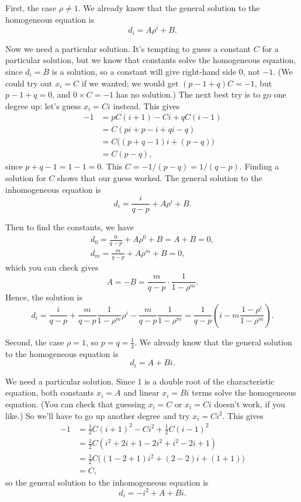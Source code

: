 \documentclass[
  a4paper,
]{article}
\theoremstyle{definition}
\theoremstyle{definition}
\theoremstyle{definition}
\theoremstyle{remark}
\begin{document}
First, the case \(\rho \neq 1\). We already know that the general solution to the homogeneous equation is
\[ d_i =  A \rho^i + B . \]

Now we need a particular solution. It's tempting to guess a constant \(C\) for a particular solution, but we know that constants solve the homogeneous equation, since \(d_i = B\) is a solution, so a constant will give right-hand side \(0\), not \(-1\). (We could try out \(x_i = C\) if we wanted; we would get \((p - 1 + q)C = -1\), but \(p-1+q=0\), and \(0 \times C = -1\) has no solution.) The next best try is to go one degree up: let's guess \(x_i = Ci\) instead. This gives
\begin{align*}
  -1 &= pC(i+1) - Ci + qC(i-1)\\
     &= C(pi + p - i + qi - q) \\
     &= C\big((p+q-1)i + (p-q)\big) \\
     &= C(p-q) ,
  \end{align*}
since \(p + q - 1 = 1 - 1 = 0\). This \(C = -1/(p-q) = 1/(q-p)\). Finding a solution for \(C\) shows that our guess worked. The general solution to the inhomogeneous equation is
\[ d_i = \frac{i}{q-p} + A \rho^i + B .  \]

Then to find the constants, we have
\begin{gather*} d_0 = \frac{0}{q-p} + A \rho^0 + B = A+B = 0, \\
                  d_m = \frac{m}{q-p} + A \rho^m + B = 0 , \end{gather*}
which you can check gives
\[ A = -B = \frac{m}{q-p} \cdot \frac{1}{1 - \rho^m} . \]
Hence, the solution is
\[ d_i = \frac{i}{q-p} + \frac{m}{q-p} \frac{1}{1 - \rho^m} \rho^i - \frac{m}{q-p} \frac{1}{1 - \rho^m} =  \frac{1}{q-p} \left(i - m\frac{1-\rho^i}{1- \rho^m} \right) . \]

Second, the case \(\rho = 1\), so \(p = q = \frac12\). We already know that the general solution to the homogeneous equation is
\[ d_i =  A + Bi . \]

We need a particular solution. Since 1 is a double root of the characteristic equation, both constants \(x_i = A\) and linear \(x_i = Bi\) terms solve the homogeneous equation. (You can check that guessing \(x_i = C\) or \(x_i = Ci\) doesn't work, if you like.) So we'll have to go up another degree and try \(x_i = Ci^2\). This gives
\begin{align*}
    -1 &= \tfrac12 C(i+1)^2 - Ci^2 + \tfrac 12 C(i-1)^2 \\
       &= \tfrac12 C(i^2 + 2i + 1 - 2i^2 + i^2 - 2i + 1) \\
       &= \tfrac12 C\big((1-2+1)i^2 + (2-2)i + (1+1)\big) \\
       &=C ,
\end{align*}
so the general solution to the inhomogeneous equation is
\[ d_i = -i^2 + A + Bi .  \]
\end{document}
